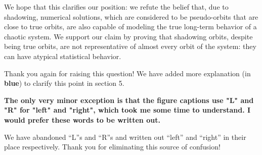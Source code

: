 \documentclass[11pt]{article}
\newcommand{\reviewerTwo}[1]{{\color{azure}\textbf{#1}}}
\begin{document}
We hope that this clarifies our position: we refute the belief that, due to shadowing, numerical solutions, which are considered to be pseudo-orbits that are close to true orbits, are also capable of modeling the true long-term behavior of a chaotic system. We support our claim by proving that shadowing orbits, despite being true orbits, are not representative of almost every orbit of the system: they can have atypical statistical behavior. 

Thank you again for raising this question! We have added more explanation (in \reviewerTwo{blue}) to clarify this point in section 5.
\vspace{0.2in}

\reviewerTwo{The only very minor exception is that the figure captions use "L" and "R" for "left" and "right", which took me some time to understand. I would prefer these words to be written out.
}

We have abandoned ``L''s and ``R''s and written out ``left'' and ``right'' in their place respectively. Thank you for eliminating this source of confusion! 


\end{document}
